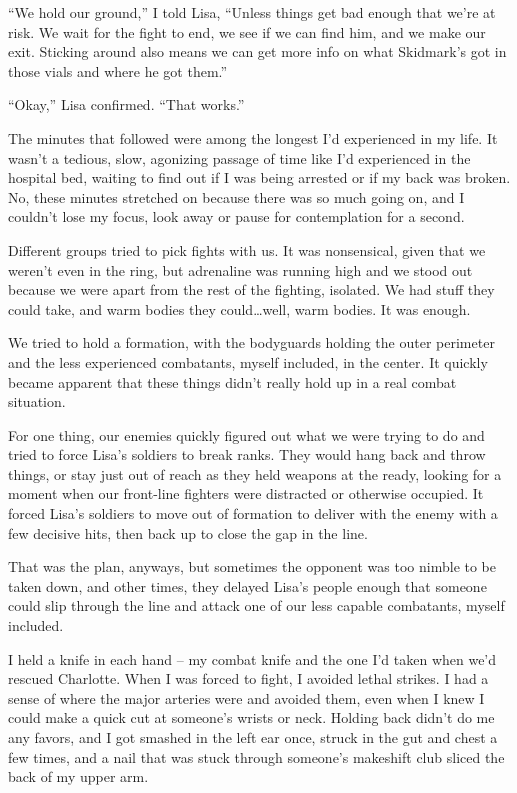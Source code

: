 ``We hold our ground,'' I told Lisa, ``Unless things get bad enough that we're at risk.  We wait for the fight to end, we see if we can find him, and we make our exit.  Sticking around also means we can get more info on what Skidmark's got in those vials and where he got them.''



``Okay,'' Lisa confirmed.  ``That works.''



The minutes that followed were among the longest I'd experienced in my life.  It wasn't a tedious, slow, agonizing passage of time like I'd experienced in the hospital bed, waiting to find out if I was being arrested or if my back was broken.  No, these minutes stretched on because there was so much going on, and I couldn't lose my focus, look away or pause for contemplation for a second.



Different groups tried to pick fights with us.  It was nonsensical, given that we weren't even in the ring, but adrenaline was running high and we stood out because we were apart from the rest of the fighting, isolated.  We had stuff they could take, and warm bodies they could\ldots well, warm bodies.  It was enough.



We tried to hold a formation, with the bodyguards holding the outer perimeter and the less experienced combatants, myself included, in the center.  It quickly became apparent that these things didn't really hold up in a real combat situation.



For one thing, our enemies quickly figured out what we were trying to do and tried to force Lisa's soldiers to break ranks.  They would hang back and throw things, or stay just out of reach as they held weapons at the ready, looking for a moment when our front-line fighters were distracted or otherwise occupied.  It forced Lisa's soldiers to move out of formation to deliver with the enemy with a few decisive hits, then back up to close the gap in the line.



That was the plan, anyways, but sometimes the opponent was too nimble to be taken down, and other times, they delayed Lisa's people enough that someone could slip through the line and attack one of our less capable combatants, myself included.



I held a knife in each hand – my combat knife and the one I'd taken when we'd rescued Charlotte.  When I was forced to fight, I avoided lethal strikes.  I had a sense of where the major arteries were and avoided them, even when I knew I could make a quick cut at someone's wrists or neck.  Holding back didn't do me any favors, and I got smashed in the left ear once, struck in the gut and chest a few times, and a nail that was stuck through someone's makeshift club sliced the back of my upper arm.



